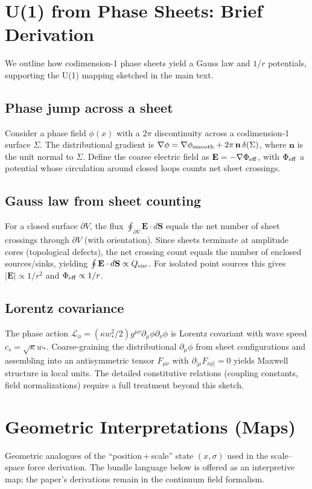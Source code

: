 \documentclass[11pt]{article}
\begin{document}
\section{U(1) from Phase Sheets: Brief Derivation}\label{si:u1-sheets}
We outline how codimension-1 phase sheets yield a Gauss law and $1/r$ potentials, supporting the U(1) mapping sketched in the main text.

\subsection*{Phase jump across a sheet}
Consider a phase field $\phi(x)$ with a $2\pi$ discontinuity across a codimension-1 surface $\Sigma$. The distributional gradient is $\nabla\phi = \nabla\phi_{\rm smooth} + 2\pi\,\mathbf n\,\delta(\Sigma)$, where $\mathbf n$ is the unit normal to $\Sigma$. Define the coarse electric field as $\mathbf E = -\nabla\Phi_{\rm eff}$, with $\Phi_{\rm eff}$ a potential whose circulation around closed loops counts net sheet crossings.

\subsection*{Gauss law from sheet counting}
For a closed surface $\partial V$, the flux $\oint_{\partial V} \mathbf E \cdot d\mathbf S$ equals the net number of sheet crossings through $\partial V$ (with orientation). Since sheets terminate at amplitude cores (topological defects), the net crossing count equals the number of enclosed sources/sinks, yielding $\oint \mathbf E \cdot d\mathbf S \propto Q_{\rm enc}$. For isolated point sources this gives $|\mathbf E| \propto 1/r^2$ and $\Phi_{\rm eff} \propto 1/r$.

\subsection*{Lorentz covariance}
The phase action $\mathcal L_\phi = (\kappa w_*^2/2) g^{\mu\nu} \partial_\mu\phi \partial_\nu\phi$ is Lorentz covariant with wave speed $c_s = \sqrt{\kappa} w_*$. Coarse-graining the distributional $\partial_\mu\phi$ from sheet configurations and assembling into an antisymmetric tensor $F_{\mu\nu}$ with $\partial_{[\mu}F_{\nu\rho]} = 0$ yields Maxwell structure in local units. The detailed constitutive relations (coupling constants, field normalizations) require a full treatment beyond this sketch.

\section{Geometric Interpretations (Maps)}\label{si:geom-maps}
Geometric analogues of the ``position\,+\,scale'' state $(x,\sigma)$ used in the scale--space force derivation. The bundle language below is offered as an interpretive map; the paper's derivations remain in the continuum field formalism.
\end{document}
